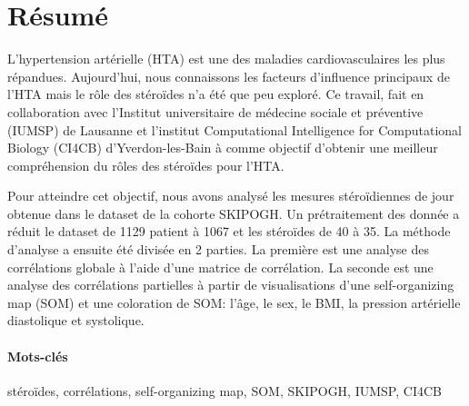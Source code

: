 

\cleardoublepage
\chapter*{Résumé}

	L'hypertension artérielle (HTA) est une des maladies cardiovasculaires les plus répandues. Aujourd'hui, nous connaissons les facteurs d'influence principaux de l'HTA mais le rôle des stéroïdes n'a été que peu exploré. Ce travail, fait en collaboration avec l'Institut universitaire de médecine sociale et préventive (IUMSP) de Lausanne et l'institut Computational Intelligence for Computational Biology (CI4CB) d'Yverdon-les-Bain à comme objectif d'obtenir une meilleur compréhension du rôles des stéroïdes pour l'HTA.

	Pour atteindre cet objectif, nous avons analysé les mesures stéroïdiennes de jour obtenue dans le dataset de la cohorte SKIPOGH. Un prétraitement des donnée a réduit le dataset de 1129 patient à 1067 et les stéroïdes de 40 à 35. La méthode d'analyse a ensuite été divisée en 2 parties. La première est une analyse des corrélations globale à l'aide d'une matrice de corrélation. La seconde est une analyse des corrélations partielles à partir de visualisations d'une self-organizing map (SOM) et une coloration de SOM: l'âge, le sex, le BMI, la pression artérielle diastolique et systolique. 


	\vskip0.5cm

	\subsubsection*{Mots-clés} 
	
	\vskip0.25cm
	
	\noindent stéroïdes, corrélations, self-organizing map, SOM, SKIPOGH, IUMSP, CI4CB